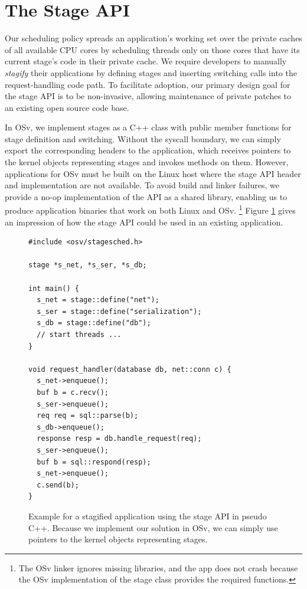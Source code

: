 \documentclass[12pt,a4paper]{book}
\begin{document}
\section{The Stage API}\label{ch:di:api}
Our scheduling policy spreads an application's working set over the private caches of all available CPU cores by scheduling threads only on those cores that have its current stage's code in their private cache.
We require developers to manually \emph{stagify} their applications by defining stages and inserting switching calls into the request-handling code path.
To facilitate adoption, our primary design goal for the stage API is to be non-invasive, allowing maintenance of private patches to an existing open source code base.

In OSv, we implement stages as a C++ class with public member functions for stage definition and switching.
Without the syscall boundary, we can simply export the corresponding headers to the application, which receives pointers to the kernel objects representing stages and invokes methods on them.
However, applications for OSv must be built on the Linux host where the stage API header and implementation are not available.
To avoid build and linker failures, we provide a no-op implementation of the API as a shared library, enabling us to produce application binaries that work on both Linux and OSv.%
\footnote{The OSv linker ignores missing libraries, and the app does not crash because the OSv implementation of the stage class provides the required functions.}
Figure \ref{fig:di:api:exampleraw} gives an impression of how the stage API could be used in an existing application.

\begin{figure}
\begin{lstlisting}[style=figurecpp,morekeywords={stage,stage::define,enqueue}]
#include <osv/stagesched.h>

stage *s_net, *s_ser, *s_db;

int main() {
  s_net = stage::define("net");
  s_ser = stage::define("serialization");
  s_db = stage::define("db");
  // start threads ...
}

void request_handler(database db, net::conn c) {
  s_net->enqueue();
  buf b = c.recv();
  s_ser->enqueue();
  req req = sql::parse(b);
  s_db->enqueue();
  response resp = db.handle_request(req);
  s_ser->enqueue();
  buf b = sql::respond(resp);
  s_net->enqueue();
  c.send(b);
}
\end{lstlisting}
\caption{Example for a stagified application using the stage API in pseudo C++. Because we implement our solution in OSv, we can simply use pointers to the kernel objects representing stages.}
\label{fig:di:api:exampleraw}
\end{figure}
\end{document}
